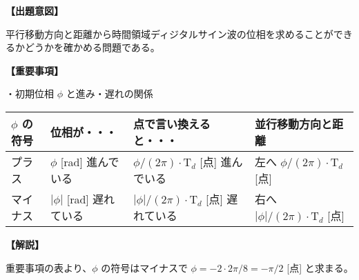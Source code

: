 \noindent \textbf{【出題意図】}

\bigskip
\noindent 平行移動方向と距離から時間領域ディジタルサイン波の位相を求めることができるかどうかを確かめる問題である。

\vspace{1em}
\noindent \textbf{【重要事項】}

\noindent ・初期位相 $\phi$ と進み・遅れの関係

\medskip
\begin{center}
\small
\begin{tabularx}{0.9\fbwidth}{|X|X|X|X|}
\hline
$\phi$ の符号&  位相が・・・   & 点で言い換えると・・・   & 並行移動方向と距離 \\
\hline
プラス &  $\phi$ [rad] 進んでいる & $\phi/(2\pi) \cdot \textrm{T}_d$ [点] 進んでいる & 左へ $\phi/(2\pi) \cdot \textrm{T}_d$ [点] \\
\hline
マイナス &  $|\phi|$ [rad] 遅れている & $|\phi|/(2\pi) \cdot \textrm{T}_d$ [点] 遅れている & 右へ $|\phi|/(2\pi) \cdot \textrm{T}_d$ [点] \\
\hline
\end{tabularx}
\end{center}

\bigskip

\vspace{1em}
\noindent \textbf{【解説】}

\bigskip
\noindent 重要事項の表より、$\phi$ の符号はマイナスで $\phi = -2 \cdot 2\pi / 8 = -\pi/2$ [点] と求まる。
